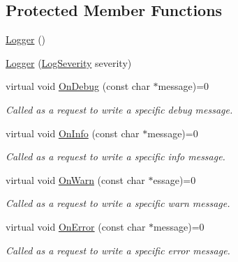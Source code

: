 \subsection*{Protected Member Functions}
\begin{CompactItemize}
\item 
\hyperlink{class_assimp_1_1_logger_784e6d1a741072b17bab32a6a41055e8}{Logger} ()
\item 
\hyperlink{class_assimp_1_1_logger_ccc0ffea63ddf0982d8c2ba7e07f0716}{Logger} (\hyperlink{class_assimp_1_1_logger_8b6248a0fd062431e8572556350d29e6}{LogSeverity} severity)
\item 
virtual void \hyperlink{class_assimp_1_1_logger_ded6996d20f14204877097b88bd5eac6}{OnDebug} (const char $\ast$message)=0
\begin{CompactList}\small\item\em Called as a request to write a specific debug message. \item\end{CompactList}\item 
virtual void \hyperlink{class_assimp_1_1_logger_ba81c4562ff8db83f06c6b62f2eb7983}{OnInfo} (const char $\ast$message)=0
\begin{CompactList}\small\item\em Called as a request to write a specific info message. \item\end{CompactList}\item 
virtual void \hyperlink{class_assimp_1_1_logger_b8066978dd37992f711d75d49cf4607b}{OnWarn} (const char $\ast$essage)=0
\begin{CompactList}\small\item\em Called as a request to write a specific warn message. \item\end{CompactList}\item 
virtual void \hyperlink{class_assimp_1_1_logger_e2ea0790aba6125b90af0f2768b0759d}{OnError} (const char $\ast$message)=0
\begin{CompactList}\small\item\em Called as a request to write a specific error message. \item\end{CompactList}\end{CompactItemize}
